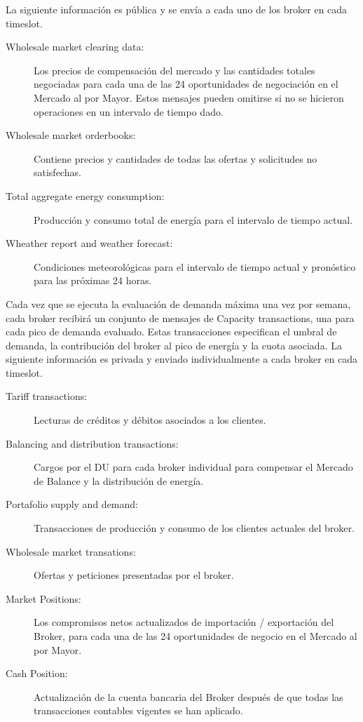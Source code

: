 La siguiente información es pública y se envía a cada uno de los broker en cada timeslot.
\begin{description}
	\item [Wholesale market clearing data: ]Los precios de compensación del mercado y las cantidades totales negociadas para cada una de las 24 oportunidades de negociación en el Mercado al por Mayor. Estos mensajes pueden omitirse si no se hicieron operaciones en un intervalo de tiempo dado.
	\item [Wholesale market orderbooks: ]Contiene precios y cantidades de todas las ofertas y solicitudes no satisfechas.
	\item [Total aggregate energy consumption: ]Producción y consumo total de energía para el intervalo de tiempo actual.
	\item [Wheather report and weather forecast:] Condiciones meteorológicas para el intervalo de tiempo actual y pronóstico para las próximas 24 horas.
\end{description}
Cada vez que se ejecuta la evaluación de demanda máxima una vez por semana, cada broker recibirá un conjunto de mensajes de Capacity transactions, una para cada pico de demanda evaluado. Estas transacciones especifican el umbral de demanda, la contribución del broker al pico de energía y la cuota asociada. La siguiente información es privada y enviado individualmente a cada broker en cada timeslot.
\begin{description}
	\item [Tariff transactions:] Lecturas de créditos y débitos asociados a los clientes.
	\item [Balancing and distribution transactions:] Cargos por el DU para cada broker individual para compensar el Mercado de Balance y la distribución de energía.
	\item [Portafolio supply and demand:] Transacciones de producción y consumo de los clientes actuales del broker.
	\item [Wholesale market transations:] Ofertas y peticiones presentadas por el broker.
	\item [Market Positions:] Los compromisos netos actualizados de importación / exportación del Broker, para cada una de las 24 oportunidades de negocio en el Mercado al por Mayor.
	\item [Cash Position: ]Actualización de la cuenta bancaria del Broker después de que todas las transacciones contables vigentes se han aplicado.
\end{description}

